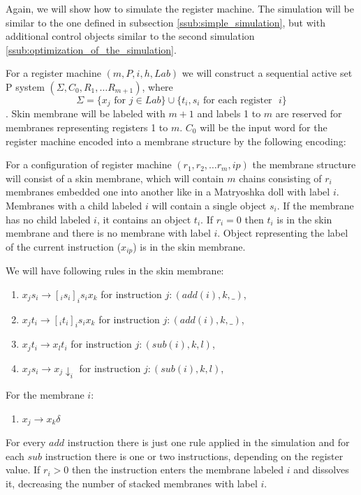     \begin{dokaz}
      Again, we will show how to simulate the register machine. The simulation will be similar to the one defined in subsection \ref{ssub:simple_simulation}, but with additional control objects similar to the second simulation \ref{ssub:optimization_of_the_simulation}.

      For a register machine $(m,P,i,h,Lab)$ we will construct a sequential active set P system $(\Sigma, C_0, R_1, \ldots R_{m+1})$, where $$\Sigma = \{x_j \text{~for~} j\in Lab\}\cup\{t_i, s_i \text{~for each register ~}i\}$$. Skin membrane will be labeled with $m+1$ and labels 1 to $m$ are reserved for membranes representing registers 1 to $m$. $C_0$ will be the input word for the register machine encoded into a membrane structure by the following encoding: 

      For a configuration of register machine $(r_1, r_2, \ldots r_m, ip)$ the membrane structure will consist of a skin membrane, which will contain $m$ chains consisting of $r_i$ membranes embedded one into another like in a Matryoshka doll with label $i$. Membranes with a child labeled $i$ will contain a single object $s_i$. If the membrane has no child labeled $i$, it contains an object $t_i$. If $r_i = 0$ then $t_i$ is in the skin membrane and there is no membrane with label $i$. Object representing the label of the current instruction ($x_{ip}$) is in the skin membrane.

      We will have following rules in the skin membrane:
      \begin{enumerate}
        \item\label{wrap_skin_add_s} $x_j s_i\rightarrow [_i s_i ]_i s_i x_k$ for instruction $j: (add(i), k, \_)$,
        \item\label{wrap_skin_add_t} $x_j t_i\rightarrow [_i t_i ]_i s_i x_k$ for instruction $j: (add(i), k, \_)$,
        \item\label{wrap_skin_sub_t} $x_j t_i\rightarrow x_l t_i$ for instruction $j: (sub(i), k, l)$,
        \item\label{wrap_skin_sub_s} $x_j s_i\rightarrow x_j\downarrow_i$ for instruction $j: (sub(i), k, l)$,
      \end{enumerate}

      For the membrane $i$:
      \begin{enumerate}[resume]
        \item\label{wrap_inner_dissolve} $x_j \rightarrow x_k\delta$
      \end{enumerate}

      For every $add$ instruction there is just one rule applied in the simulation and for each $sub$ instruction there is one or two instructions, depending on the register value. If $r_i>0$ then the instruction enters the membrane labeled $i$ and dissolves it, decreasing the number of stacked membranes with label $i$.
    \end{dokaz}

